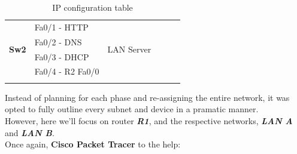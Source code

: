 \documentclass[11pt,a4paper]{report}
\begin{document}
\begin{center}
\begin{longtable}{@{}llllll@{}}
                \multirow{4}{*}{\textbf{Sw2}}                      & Fa0/1 - HTTP                                             & \multirow{4}{*}{LAN Server}                           & \multicolumn{1}{c}{}                             & \multicolumn{1}{c}{}                                      & \multicolumn{1}{c}{}                                  \\
                                                                   & Fa0/2 - DNS                                              &                                                       & \multicolumn{1}{c}{}                             & \multicolumn{1}{c}{}                                      & \multicolumn{1}{c}{}                                  \\
                                                                   & Fa0/3 - DHCP                                             &                                                       & \multicolumn{1}{c}{}                             & \multicolumn{1}{c}{}                                      & \multicolumn{1}{c}{}                                  \\
                                                                   & Fa0/4 - R2 Fa0/0                                         &                                                       & \multicolumn{1}{c}{}                             & \multicolumn{1}{c}{}                                      & \multicolumn{1}{c}{}                                  \\* \bottomrule
                \caption{IP configuration table}
                \label{tab:deviceiptable}\\
                \end{longtable}
        \end{center}

        Instead of planning for each phase and re-assigning the entire network, it was opted to fully outline every subnet and device in a pramatic manner.\\
        However, here we'll focus on router \textbf{\textit{R1}}, and the respective networks, \textbf{\textit{LAN A}} and \textbf{\textit{LAN B}}.\\

        Once again, \textbf{Cisco Packet Tracer} to the help:
\end{document}
